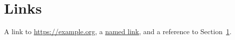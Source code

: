 \documentclass{article}
\begin{document}
\section{Links}\label{sec:links}
A link to \url{https://example.org}, a \href{https://example.org/a}{named
link}, and a reference to Section~\ref{sec:links}.
\end{document}
